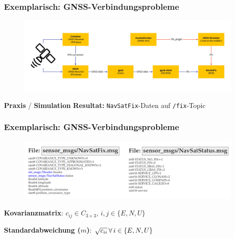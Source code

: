 \documentclass{beamer}
\newcommand{\code}[1]{\colorbox{light-gray}{\texttt{#1}}}
\begin{document}
\begin{frame}
  \frametitle{Exemplarisch: GNSS-Verbindungsprobleme}
  \begin{figure}[H]
    \centering
    \includegraphics[width=\textwidth]{img/GNSS_comm.png}
  \end{figure}
  \textbf{\textcolor{myblue}{Praxis}} / \textbf{\textcolor{myred}{Simulation}}\linebreak
  \textbf{Resultat:} \code{NavSatFix}-Daten auf \code{/fix}-Topic
\end{frame}

\begin{frame}
  \frametitle{Exemplarisch: GNSS-Verbindungsprobleme}
  \begin{figure}[H]
    \centering
    \includegraphics[width=\textwidth]{img/navsatfix.png}
  \end{figure}
  \textbf{Kovarianzmatrix}: $c_{ij} \in C_{3 \times 3}$, $i, j \in \{E, N, U\}$

  \textbf{Standardabweichung ($m$)}: $\sqrt{c_{ii}} \thinspace \forall \thinspace i \in \{E, N, U\}$
\end{frame}
\end{document}
